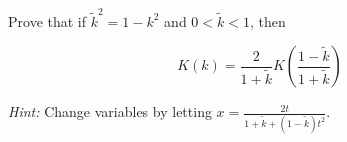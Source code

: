 Prove that if $\tilde{k}^2 = 1 - k^2$ and $0 < \tilde{k} < 1$, then

$$
K(k) = \frac{2}{1 + \tilde{k}} K\left(\frac{1 - \tilde{k}}{1 + \tilde{k}} \right)
$$

\textit{Hint:} Change variables by letting $x = \frac{2t}{1 + \tilde{k} + \left(1 - \tilde{k}\right) t^2}$.

\begin{solution}
  \ \\
\end{solution}